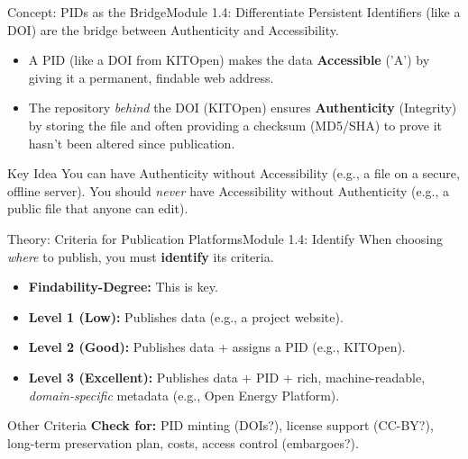 \begin{frame}{Concept: PIDs as the Bridge}{Module 1.4: Differentiate}
    Persistent Identifiers (like a DOI) are the bridge between Authenticity and Accessibility.
    
    \begin{itemize}
        \item A PID (like a DOI from KITOpen) makes the data \textbf{Accessible} ('A') by giving it a permanent, findable web address.
        \pause
        \item The repository \textit{behind} the DOI (KITOpen) ensures \textbf{Authenticity} (Integrity) by storing the file and often providing a checksum (MD5/SHA) to prove it hasn't been altered since publication.
    \end{itemize}
    \pause
    \begin{block}{Key Idea}
        You can have Authenticity without Accessibility (e.g., a file on a secure, offline server).
        \pause
        You should \textit{never} have Accessibility without Authenticity (e.g., a public file that anyone can edit).
    \end{block}
\end{frame}

\begin{frame}{Theory: Criteria for Publication Platforms}{Module 1.4: Identify}
    When choosing \textit{where} to publish, you must \textbf{identify} its criteria.
    \begin{itemize}
        \item \textbf{Findability-Degree:} This is key.
        \pause
        \item \textbf{Level 1 (Low):} Publishes data (e.g., a project website).
        \pause
        \item \textbf{Level 2 (Good):} Publishes data + assigns a PID (e.g., KITOpen).
        \pause
        \item \textbf{Level 3 (Excellent):} Publishes data + PID + rich, machine-readable, \emph{domain-specific} metadata (e.g., Open Energy Platform).
    \end{itemize}
    \pause
    \begin{block}{Other Criteria}
        \textbf{Check for:} PID minting (DOIs?), license support (CC-BY?), long-term preservation plan, costs, access control (embargoes?).
    \end{block}
\end{frame}

